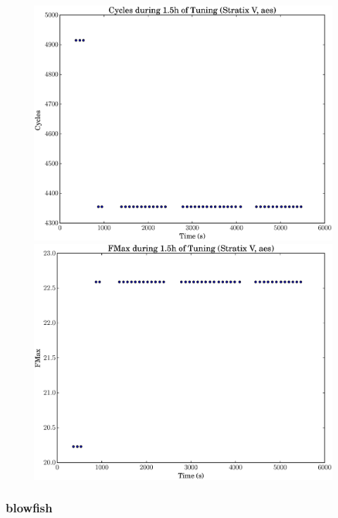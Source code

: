 \documentclass[12pt, a4paper]{article}
\begin{document}
\begin{figure}[htpb]
    \begin{minipage}{.48\textwidth}
        \includegraphics[scale=.25]{aes_cycles_5400_chstone_StratixV}
    \end{minipage}%
    \hfill
    \begin{minipage}{.48\textwidth}
        \includegraphics[scale=.25]{aes_fmax_5400_chstone_StratixV}
    \end{minipage}%
\end{figure}

\newpage

\subsubsection{blowfish}
\end{document}
